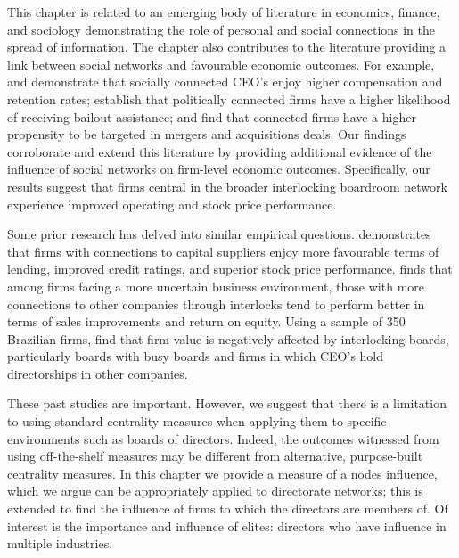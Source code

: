 This chapter is related to an emerging body of literature in economics, finance, and sociology demonstrating the role of personal and social connections in the spread of information. The chapter also contributes to the literature providing a link between social networks and favourable economic outcomes. For example, \citet{HwangKim2009} and \citet{HwangKim2012} demonstrate that socially connected CEO's enjoy higher compensation and retention rates; \citet{FaccioMcConnellMasulis2006} establish that politically connected firms have a higher likelihood of receiving bailout assistance; and \citet{StuartYim2010} find that connected firms have a higher propensity to be targeted in mergers and acquisitions deals. Our findings corroborate and extend this literature by providing additional evidence of the influence of social networks on firm-level economic outcomes. Specifically, our results suggest that firms central in the broader interlocking boardroom network experience improved operating and stock price performance.

Some prior research has delved into similar empirical questions. \citet{EngelbergGaoParsons2013} demonstrates that firms with connections to capital suppliers enjoy more favourable terms of lending, improved credit ratings, and superior stock price performance. \citet{Boyd1990} finds that among firms facing a more uncertain business environment, those with more connections to other companies through interlocks tend to perform better in terms of sales improvements and return on equity. Using a sample of 350 Brazilian firms, \citet{SantosSilveiraBarros2009} find that firm value is negatively affected by interlocking boards, particularly boards with busy boards and firms in which CEO's hold directorships in other companies. 


These past studies are important. However, we suggest that there is a limitation to using standard centrality measures when applying them to specific environments such as boards of directors. Indeed, the outcomes witnessed from using off-the-shelf measures may be different from alternative, purpose-built centrality measures. In this chapter we provide a measure of a nodes influence, which we argue can be appropriately applied to directorate networks; this is extended to find the influence of firms to which the directors are members of. Of interest is the importance and influence of elites: directors who have influence in multiple industries.

